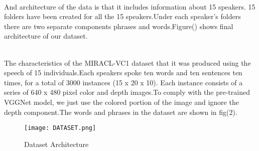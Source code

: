 \documentclass[conference]{IEEEtran}
\begin{document}
\\ And architecture of the data is that it includes information about 15 speakers. 15 folders have been created for all the 15 speakers.Under each speaker's folders there are two separate components phrases and words.Figure() shows final architecture of our dataset.

\\ The characteristics of the MIRACL-VC1 dataset that it was produced using the speech of 15 individuals.Each speakers spoke ten words and ten sentences ten times, for a total of 3000 instances (15 x 20 x 10). Each instance consists of a series of 640 x 480 pixel color and depth images.To comply with the pre-trained VGGNet model, we just use the colored portion of the image and ignore the depth component.The words and phrases in the dataset are shown in fig(2).

\begin{figure}[htbp]
\centerline{\texttt{[image: DATASET.png]}}
\caption{Dataset Architecture}
\label{fig}
\end{figure}
\end{document}
